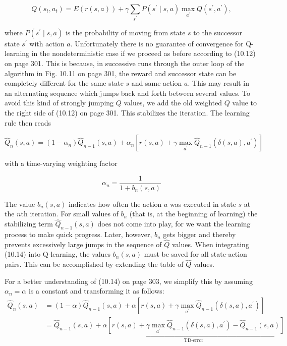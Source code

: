 \documentclass[10pt]{book}
\begin{document}
\begin{equation*}
Q\left(s_{t}, a_{t}\right)=E(r(s, a))+\gamma \sum_{s^{\prime}} P\left(s^{\prime} \mid s, a\right) \max _{a^{\prime}} Q\left(s^{\prime}, a^{\prime}\right), \tag{10.13}
\end{equation*}

where $P\left(s^{\prime} \mid s, a\right)$ is the probability of moving from state $s$ to the successor state $s^{\prime}$ with action $a$. Unfortunately there is no guarantee of convergence for Q-learning in the nondeterministic case if we proceed as before according to (10.12) on page 301. This is because, in successive runs through the outer loop of the algorithm in Fig. 10.11 on page 301, the reward and successor state can be completely different for the same state $s$ and same action $a$. This may result in an alternating sequence which jumps back and forth between several values. To avoid this kind of strongly jumping $Q$ values, we add the old weighted $Q$ value to the right side of (10.12) on page 301. This stabilizes the iteration. The learning rule then reads

\begin{equation*}
\hat{Q}_{n}(s, a)=\left(1-\alpha_{n}\right) \hat{Q}_{n-1}(s, a)+\alpha_{n}\left[r(s, a)+\gamma \max _{a^{\prime}} \hat{Q}_{n-1}\left(\delta(s, a), a^{\prime}\right)\right] \tag{10.14}
\end{equation*}

with a time-varying weighting factor

$$
\alpha_{n}=\frac{1}{1+b_{n}(s, a)}
$$

The value $b_{n}(s, a)$ indicates how often the action $a$ was executed in state $s$ at the $n$th iteration. For small values of $b_{n}$ (that is, at the beginning of learning) the stabilizing term $\hat{Q}_{n-1}(s, a)$ does not come into play, for we want the learning process to make quick progress. Later, however, $b_{n}$ gets bigger and thereby prevents excessively large jumps in the sequence of $\hat{Q}$ values. When integrating (10.14) into Q-learning, the values $b_{n}(s, a)$ must be saved for all state-action pairs. This can be accomplished by extending the table of $\hat{Q}$ values.

For a better understanding of (10.14) on page 303, we simplify this by assuming $\alpha_{n}=\alpha$ is a constant and transforming it as follows:
$$
\begin{aligned}
\hat{Q}_{n}(s, a) & =(1-\alpha) \hat{Q}_{n-1}(s, a)+\alpha\left[r(s, a)+\gamma \max _{a^{\prime}} \hat{Q}_{n-1}\left(\delta(s, a), a^{\prime}\right)\right] \\
& =\hat{Q}_{n-1}(s, a)+\underbrace{\alpha\left[r(s, a)+\gamma \max _{a^{\prime}} \hat{Q}_{n-1}\left(\delta(s, a), a^{\prime}\right)-\hat{Q}_{n-1}(s, a)\right]}_{\text{TD-error}}
\end{aligned}
$$
\end{document}
